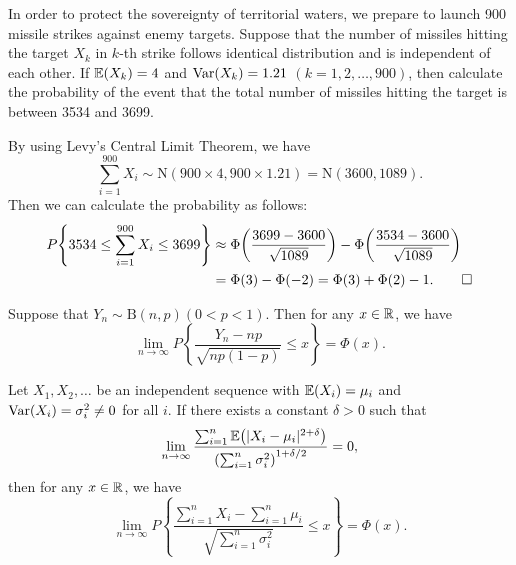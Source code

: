\begin{example}
  In order to protect the sovereignty of territorial waters, we prepare to launch 900 missile strikes against enemy targets. Suppose that the number of missiles hitting the target \(X_k\) in \(k\)-th strike follows identical distribution and is independent of each other. If \(\mathbb{E}(X_k) = 4\) and \(\mathrm{Var}(X_k) = 1.21\) \((k = 1, 2, \dots, 900)\), then calculate the probability of the event that the total number of missiles hitting the target is between 3534 and 3699.
\end{example}
\begin{solution}
  By using Levy's Central Limit Theorem, we have
  \[
    \sum_{i=1}^{900} X_i \sim \mathrm{N}(900 \times 4, 900 \times 1.21) = \mathrm{N}(3600, 1089).
  \]
  Then we can calculate the probability as follows:
  \begin{align*}
    P\!\left\{ 3534 \leq \sum_{i=1}^{900} X_i \leq 3699 \right\} &\approx \Phi\!\left( \frac{3699 - 3600}{\sqrt{1089}} \right) - \Phi\!\left( \frac{3534 - 3600}{\sqrt{1089}} \right) \\
    &= \Phi(3) - \Phi(-2) = \Phi(3) + \Phi(2) - 1. \qedhere
  \end{align*}
\end{solution}

\begin{theorem}
  Suppose that \(Y_n \sim \mathrm{B}(n, p) (0 < p < 1)\). Then for any \(x \in \mathbb{R}\), we have
  \[
    \lim_{n \to \infty} P\!\left\{ \frac{Y_n - np}{\sqrt{np(1-p)}} \leq x \right\} = \Phi(x).
  \]
\end{theorem}

\begin{theorem}
  Let \(X_1, X_2, \ldots\) be an independent sequence with \(\mathbb{E}(X_i) = \mu_i\) and \(\mathrm{Var}(X_i) = \sigma_i^2 \neq 0\) for all \(i\). If there exists a constant \(\delta > 0\) such that
  \[
    \lim_{n \to \infty} \frac{\sum_{i=1}^n \mathbb{E}\!\left( |X_i - \mu_i|^{2+\delta} \right)}{\left( \sum_{i=1}^n \sigma_i^2 \right)^{1 + \delta/2}} = 0,
  \]
  then for any \(x \in \mathbb{R}\), we have
  \[
    \lim_{n \to \infty} P\!\left\{ \frac{\sum_{i=1}^n X_i - \sum_{i=1}^n \mu_i}{\sqrt{\sum_{i=1}^n \sigma_i^2}} \leq x \right\} = \Phi(x).
  \]
\end{theorem}